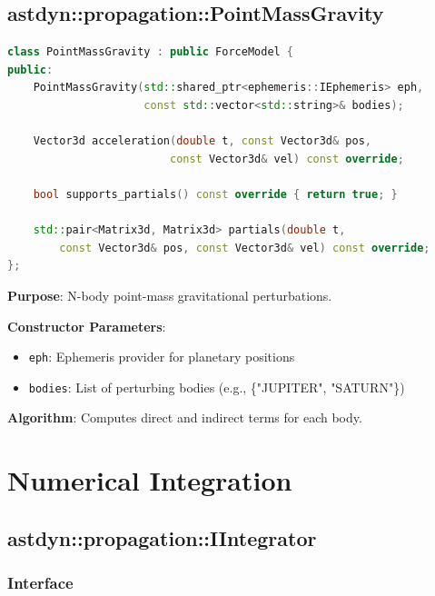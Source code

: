 \subsection{astdyn::propagation::PointMassGravity}

\begin{lstlisting}[language=C++]
class PointMassGravity : public ForceModel {
public:
    PointMassGravity(std::shared_ptr<ephemeris::IEphemeris> eph,
                     const std::vector<std::string>& bodies);
    
    Vector3d acceleration(double t, const Vector3d& pos, 
                         const Vector3d& vel) const override;
    
    bool supports_partials() const override { return true; }
    
    std::pair<Matrix3d, Matrix3d> partials(double t, 
        const Vector3d& pos, const Vector3d& vel) const override;
};
\end{lstlisting}

\textbf{Purpose}: N-body point-mass gravitational perturbations.

\textbf{Constructor Parameters}:
\begin{itemize}
    \item \texttt{eph}: Ephemeris provider for planetary positions
    \item \texttt{bodies}: List of perturbing bodies (e.g., \{"JUPITER", "SATURN"\})
\end{itemize}

\textbf{Algorithm}: Computes direct and indirect terms for each body.

\section{Numerical Integration}

\subsection{astdyn::propagation::IIntegrator}

\subsubsection{Interface}

